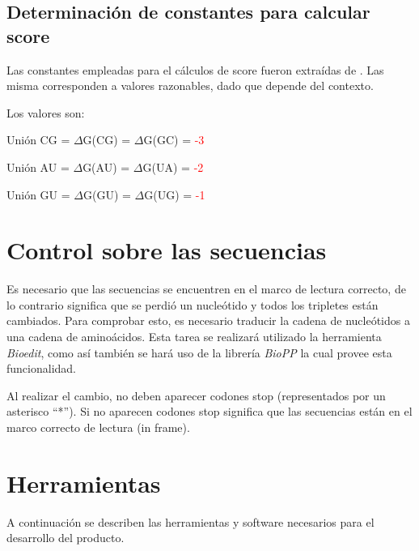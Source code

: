 \documentclass[12pt,a4paper,spanish]{article}
\begin{document}
	\subsection{Determinación de constantes para calcular score}
		\label{zuker}
		\par Las constantes empleadas para el cálculos de score fueron extraídas de \cite{6}. Las misma corresponden a 			valores razonables, dado que depende del contexto.
		\par Los valores son: 
			\par \hspace{2.8cm} Unión CG = $\Delta$G(CG) = $\Delta$G(GC) = \textcolor{red}{-3}
			\par \hspace{2.8cm} Unión AU = $\Delta$G(AU) = $\Delta$G(UA) = \textcolor{red}{-2}
			\par \hspace{2.8cm} Unión GU = $\Delta$G(GU) = $\Delta$G(UG) = \textcolor{red}{-1}

\section{Control sobre las secuencias}	
	\par Es necesario que las secuencias se encuentren en el marco de lectura correcto, de lo contrario significa que se 		perdió un nucleótido y todos los tripletes están cambiados. Para comprobar esto, es necesario traducir la cadena de 	nucleótidos a una cadena de aminoácidos. Esta tarea se realizará utilizado la herramienta \textit{Bioedit}, como así 		también se hará uso de la librería \textit{BioPP} la cual provee esta funcionalidad.	
	\par Al realizar el cambio, no deben aparecer codones stop (representados por un asterisco ``*''). Si no aparecen 		codones stop significa que las secuencias están en el marco correcto de lectura (in frame).
	
\section{Herramientas} 
	A continuación se describen las herramientas y software necesarios para el desarrollo del producto.
\end{document}
